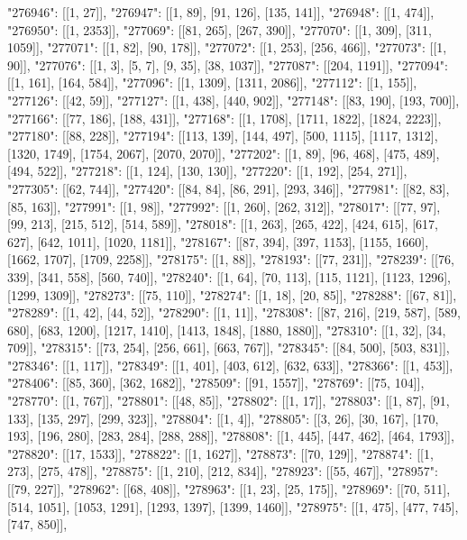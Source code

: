 { "276946": [[1, 27]],
 "276947": [[1, 89], [91, 126], [135, 141]],
 "276948": [[1, 474]],
 "276950": [[1, 2353]],
 "277069": [[81, 265], [267, 390]],
 "277070": [[1, 309], [311, 1059]],
 "277071": [[1, 82], [90, 178]],
 "277072": [[1, 253], [256, 466]],
 "277073": [[1, 90]],
 "277076": [[1, 3], [5, 7], [9, 35], [38, 1037]],
 "277087": [[204, 1191]],
 "277094": [[1, 161], [164, 584]],
 "277096": [[1, 1309], [1311, 2086]],
 "277112": [[1, 155]],
 "277126": [[42, 59]],
 "277127": [[1, 438], [440, 902]],
 "277148": [[83, 190], [193, 700]],
 "277166": [[77, 186], [188, 431]],
 "277168": [[1, 1708], [1711, 1822], [1824, 2223]],
 "277180": [[88, 228]],
 "277194": [[113, 139], [144, 497], [500, 1115], [1117, 1312], [1320, 1749], [1754, 2067], [2070, 2070]],
 "277202": [[1, 89], [96, 468], [475, 489], [494, 522]],
 "277218": [[1, 124], [130, 130]],
 "277220": [[1, 192], [254, 271]],
 "277305": [[62, 744]],
 "277420": [[84, 84], [86, 291], [293, 346]],
 "277981": [[82, 83], [85, 163]],
 "277991": [[1, 98]],
 "277992": [[1, 260], [262, 312]],
 "278017": [[77, 97], [99, 213], [215, 512], [514, 589]],
 "278018": [[1, 263], [265, 422], [424, 615], [617, 627], [642, 1011], [1020, 1181]],
 "278167": [[87, 394], [397, 1153], [1155, 1660], [1662, 1707], [1709, 2258]],
 "278175": [[1, 88]],
 "278193": [[77, 231]],
 "278239": [[76, 339], [341, 558], [560, 740]],
 "278240": [[1, 64], [70, 113], [115, 1121], [1123, 1296], [1299, 1309]],
 "278273": [[75, 110]],
 "278274": [[1, 18], [20, 85]],
 "278288": [[67, 81]],
 "278289": [[1, 42], [44, 52]],
 "278290": [[1, 11]],
 "278308": [[87, 216], [219, 587], [589, 680], [683, 1200], [1217, 1410], [1413, 1848], [1880, 1880]],
 "278310": [[1, 32], [34, 709]],
 "278315": [[73, 254], [256, 661], [663, 767]],
 "278345": [[84, 500], [503, 831]],
 "278346": [[1, 117]],
 "278349": [[1, 401], [403, 612], [632, 633]],
 "278366": [[1, 453]],
 "278406": [[85, 360], [362, 1682]],
 "278509": [[91, 1557]],
 "278769": [[75, 104]],
 "278770": [[1, 767]],
 "278801": [[48, 85]],
 "278802": [[1, 17]],
 "278803": [[1, 87], [91, 133], [135, 297], [299, 323]],
 "278804": [[1, 4]],
 "278805": [[3, 26], [30, 167], [170, 193], [196, 280], [283, 284], [288, 288]],
 "278808": [[1, 445], [447, 462], [464, 1793]],
 "278820": [[17, 1533]],
 "278822": [[1, 1627]],
 "278873": [[70, 129]],
 "278874": [[1, 273], [275, 478]],
 "278875": [[1, 210], [212, 834]],
 "278923": [[55, 467]],
 "278957": [[79, 227]],
 "278962": [[68, 408]],
 "278963": [[1, 23], [25, 175]],
 "278969": [[70, 511], [514, 1051], [1053, 1291], [1293, 1397], [1399, 1460]],
 "278975": [[1, 475], [477, 745], [747, 850]],
}
